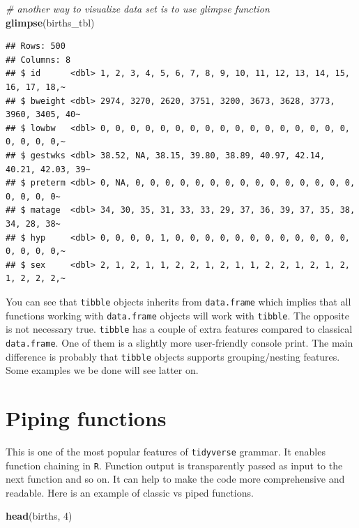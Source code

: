 \documentclass[
]{book}
\newenvironment{Shaded}{\begin{snugshade}}{\end{snugshade}}
\newcommand{\CommentTok}[1]{\textcolor[rgb]{0.56,0.35,0.01}{\textit{#1}}}
\newcommand{\DecValTok}[1]{\textcolor[rgb]{0.00,0.00,0.81}{#1}}
\newcommand{\FunctionTok}[1]{\textcolor[rgb]{0.13,0.29,0.53}{\textbf{#1}}}
\newcommand{\NormalTok}[1]{#1}
\theoremstyle{definition}
\theoremstyle{definition}
\theoremstyle{definition}
\theoremstyle{definition}
\theoremstyle{remark}
\begin{document}
\begin{Shaded}
\begin{Highlighting}[]
\CommentTok{\# another way to visualize data set is to use glimpse function}
\FunctionTok{glimpse}\NormalTok{(births\_tbl)}
\end{Highlighting}
\end{Shaded}

\begin{verbatim}
## Rows: 500
## Columns: 8
## $ id      <dbl> 1, 2, 3, 4, 5, 6, 7, 8, 9, 10, 11, 12, 13, 14, 15, 16, 17, 18,~
## $ bweight <dbl> 2974, 3270, 2620, 3751, 3200, 3673, 3628, 3773, 3960, 3405, 40~
## $ lowbw   <dbl> 0, 0, 0, 0, 0, 0, 0, 0, 0, 0, 0, 0, 0, 0, 0, 0, 0, 0, 0, 0, 0,~
## $ gestwks <dbl> 38.52, NA, 38.15, 39.80, 38.89, 40.97, 42.14, 40.21, 42.03, 39~
## $ preterm <dbl> 0, NA, 0, 0, 0, 0, 0, 0, 0, 0, 0, 0, 0, 0, 0, 0, 0, 0, 0, 0, 0~
## $ matage  <dbl> 34, 30, 35, 31, 33, 33, 29, 37, 36, 39, 37, 35, 38, 34, 28, 38~
## $ hyp     <dbl> 0, 0, 0, 0, 1, 0, 0, 0, 0, 0, 0, 0, 0, 0, 0, 0, 0, 0, 0, 0, 0,~
## $ sex     <dbl> 2, 1, 2, 1, 1, 2, 2, 1, 2, 1, 1, 2, 2, 1, 2, 1, 2, 1, 2, 2, 2,~
\end{verbatim}

You can see that \texttt{tibble} objects inherits from \texttt{data.frame} which implies that all functions
working with \texttt{data.frame} objects will work with \texttt{tibble}. The opposite is
not necessary true. \texttt{tibble} has a couple of extra features compared to classical
\texttt{data.frame}. One of them is a slightly more user-friendly console print. The main
difference is probably that \texttt{tibble} objects supports grouping/nesting features.
Some examples we be done will see latter on.

\section{Piping functions}\label{piping-functions}

This is one of the most popular features of \texttt{tidyverse} grammar. It enables function chaining in
\texttt{R}. Function output is transparently passed as input to the next function and so on.
It can help to make the code more comprehensive and readable.
Here is an example of classic vs piped functions.

\begin{Shaded}
\begin{Highlighting}[]
\FunctionTok{head}\NormalTok{(births, }\DecValTok{4}\NormalTok{)}
\end{Highlighting}
\end{Shaded}
\end{document}

